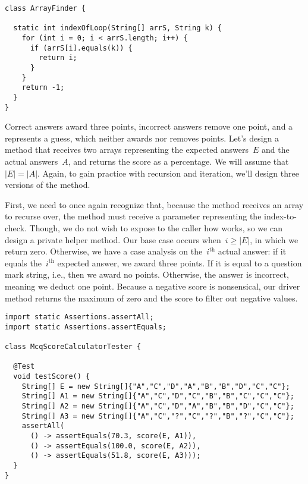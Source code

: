 \begin{lstlisting}[language=MyJava]
class ArrayFinder {
  
  static int indexOfLoop(String[] arrS, String k) {
    for (int i = 0; i < arrS.length; i++) {
      if (arrS[i].equals(k)) { 
        return i; 
      }
    }
    return -1;
  }
}
\end{lstlisting}

 Correct answers award three points, incorrect answers remove one point, and a  represents a guess, which neither awards nor removes points. 
Let's design a method that receives two  arrays representing the expected answers~$E$ and the actual answers~$A$, and returns the score as a percentage. 
We will assume that~$|E|=|A|$. 
Again, to gain practice with recursion and iteration, we'll design three versions of the  method.

First, we need to once again recognize that, because the method receives an array to recurse over, the method must receive a parameter representing the index-to-check. 
Though, we do not wish to expose to the caller how  works, so we can design a private helper method. 
Our base case occurs when~$i \geq |E|$, in which we return zero. 
Otherwise, we have a case analysis on the~$i^\text{th}$ actual answer: if it equals the~$i^\text{th}$ expected answer, we award three points. 
If it is equal to a question mark string, i.e.,  then we award no points. 
Otherwise, the answer is incorrect, meaning we deduct one point. 
Because a negative score is nonsensical, our driver method returns the maximum of zero and the score to filter out negative values.

\enlargethispage{-3\baselineskip}
\begin{lstlisting}[language=MyJava]
import static Assertions.assertAll;
import static Assertions.assertEquals;

class McqScoreCalculatorTester {

  @Test
  void testScore() {    
    String[] E = new String[]{"A","C","D","A","B","B","D","C","C"};
    String[] A1 = new String[]{"A","C","D","C","B","B","C","C","C"};
    String[] A2 = new String[]{"A","C","D","A","B","B","D","C","C"};
    String[] A3 = new String[]{"A","C","?","C","?","B","?","C","C"};
    assertAll(
      () -> assertEquals(70.3, score(E, A1)),
      () -> assertEquals(100.0, score(E, A2)),
      () -> assertEquals(51.8, score(E, A3)));
  }
}
\end{lstlisting}

